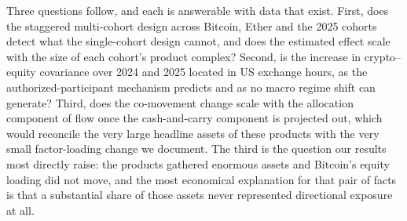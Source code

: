 \documentclass[12pt,a4paper]{article}
\begin{document}
Three questions follow, and each is answerable with data that exist. First, does the staggered multi-cohort design across Bitcoin, Ether and the 2025 cohorts detect what the single-cohort design cannot, and does the estimated effect scale with the size of each cohort's product complex? Second, is the increase in crypto--equity covariance over 2024 and 2025 located in US exchange hours, as the authorized-participant mechanism predicts and as no macro regime shift can generate? Third, does the co-movement change scale with the allocation component of flow once the cash-and-carry component is projected out, which would reconcile the very large headline assets of these products with the very small factor-loading change we document. The third is the question our results most directly raise: the products gathered enormous assets and Bitcoin's equity loading did not move, and the most economical explanation for that pair of facts is that a substantial share of those assets never represented directional exposure at all.


\end{document}
